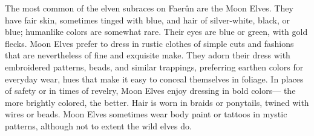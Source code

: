 
The most common of the elven subraces on Faerûn are the Moon Elves. They have fair skin, sometimes tinged with blue, and hair of silver-white, black, or blue; humanlike colors are somewhat rare. Their eyes are blue or green, with gold flecks. Moon Elves prefer to dress in rustic clothes of simple cuts and fashions that are nevertheless of fine and exquisite make. They adorn their dress with embroidered patterns, beads, and similar trappings, preferring earthen colors for everyday wear, hues that make it easy to conceal themselves in foliage. In places of safety or in times of revelry, Moon Elves enjoy dressing in bold colors— the more brightly colored, the better. Hair is worn in braids or ponytails, twined with wires or beads. Moon Elves sometimes wear body paint or tattoos in mystic patterns, although not to extent the wild elves do.

